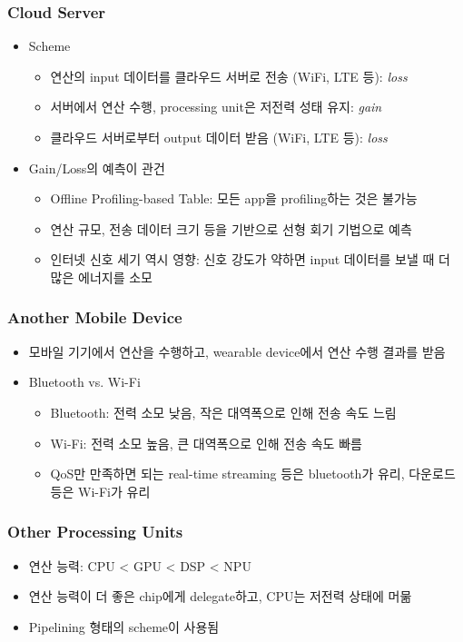 \subsubsection*{Cloud Server}
\begin{itemize}
    \item Scheme
    \begin{itemize}
        \item 연산의 input 데이터를 클라우드 서버로 전송 (WiFi, LTE 등): \textit{loss}
        \item 서버에서 연산 수행, processing unit은 저전력 성태 유지: \textit{gain}
        \item 클라우드 서버로부터 output 데이터 받음 (WiFi, LTE 등): \textit{loss}
    \end{itemize}
    \newpage
    \item Gain/Loss의 예측이 관건
    \begin{itemize}
        \item Offline Profiling-based Table: 모든 app을 profiling하는 것은 불가능
        \item 연산 규모, 전송 데이터 크기 등을 기반으로 선형 회기 기법으로 예측
        \item 인터넷 신호 세기 역시 영향: 신호 강도가 약하면 input 데이터를 보낼 때 더 많은 에너지를 소모
    \end{itemize}
\end{itemize}

\subsubsection*{Another Mobile Device}
\begin{itemize}
    \item 모바일 기기에서 연산을 수행하고, wearable device에서 연산 수행 결과를 받음
    \item Bluetooth vs. Wi-Fi
    \begin{itemize}
        \item Bluetooth: 전력 소모 낮음, 작은 대역폭으로 인해 전송 속도 느림
        \item Wi-Fi: 전력 소모 높음, 큰 대역폭으로 인해 전송 속도 빠름
        \item QoS만 만족하면 되는 real-time streaming 등은 bluetooth가 유리, 다운로드 등은 Wi-Fi가 유리
    \end{itemize}
\end{itemize}

\subsubsection*{Other Processing Units}
\begin{itemize}
    \item 연산 능력: CPU < GPU < DSP < NPU
    \item 연산 능력이 더 좋은 chip에게 delegate하고, CPU는 저전력 상태에 머묾
    \item Pipelining 형태의 scheme이 사용됨
\end{itemize}
